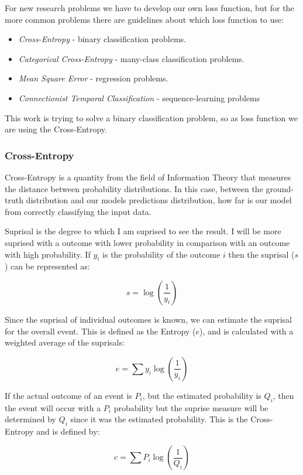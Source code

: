 For new research problems we have to develop our own loss function, but for the more common problems there are guidelines about which loss function to use:

\begin{itemize}
\item \emph{Cross-Entropy} - binary classification problems.
\item \emph{Categorical Cross-Entropy} - many-class classification problems.
\item \emph{Mean Square Error} - regression problems.
\item \emph{Connectionist Temporal Classification} - sequence-learning problems
\end{itemize}

This work is trying to solve a binary classification problem, so as loss function we are using the Cross-Entropy.

\subsubsection{Cross-Entropy}

Cross-Entropy is a quantity from the field of Information Theory that measures the distance between probability distributions. In this case, between the ground-truth distribution and our models predictions distribution, how far is our model from correctly classifying the input data.

Suprisal is the degree to which I am suprised to see the result. I will be more suprised with a outcome with lower probability in comparison with an outcome with high probability. If $y_i$ is the probability of the outcome $i$ then the suprisal ($s$) can be represented as:

$$s=\log\left ( \frac{1}{y_i} \right )$$

Since the suprisal of individual outcomes is known, we can estimate the suprisal for the overall event. This is defined as the Entropy ($e$), and is calculated with a weighted average of the suprisals:

$$ e = \sum y_i\log\left ( \frac{1}{y_i} \right ) $$

If the actual outcome of an event is $P_i$, but the estimated probability is $Q_i$, then the event will occur with a $P_i$ probability but the suprise measure will be determined by $Q_i$ since it was the estimated probability. This is the Cross-Entropy and is defined by:

$$c = \sum P_i\log\left ( \frac{1}{Q_i} \right )$$

